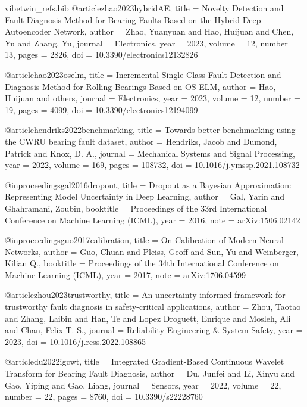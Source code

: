 \begin{filecontents*}{vibetwin_refs.bib}
@article{zhao2023hybridAE,
  title   = {Novelty Detection and Fault Diagnosis Method for Bearing Faults Based on the Hybrid Deep Autoencoder Network},
  author  = {Zhao, Yuanyuan and Hao, Huijuan and Chen, Yu and Zhang, Yu},
  journal = {Electronics},
  year    = {2023},
  volume  = {12},
  number  = {13},
  pages   = {2826},
  doi     = {10.3390/electronics12132826}
}

@article{hao2023oselm,
  title   = {Incremental Single-Class Fault Detection and Diagnosis Method for Rolling Bearings Based on {OS-ELM}},
  author  = {Hao, Huijuan and others},
  journal = {Electronics},
  year    = {2023},
  volume  = {12},
  number  = {19},
  pages   = {4099},
  doi     = {10.3390/electronics12194099}
}

@article{hendriks2022benchmarking,
  title   = {Towards better benchmarking using the {CWRU} bearing fault dataset},
  author  = {Hendriks, Jacob and Dumond, Patrick and Knox, D. A.},
  journal = {Mechanical Systems and Signal Processing},
  year    = {2022},
  volume  = {169},
  pages   = {108732},
  doi     = {10.1016/j.ymssp.2021.108732}
}

@inproceedings{gal2016dropout,
  title     = {Dropout as a {Bayesian} Approximation: Representing Model Uncertainty in Deep Learning},
  author    = {Gal, Yarin and Ghahramani, Zoubin},
  booktitle = {Proceedings of the 33rd International Conference on Machine Learning ({ICML})},
  year      = {2016},
  note      = {arXiv:1506.02142}
}

@inproceedings{guo2017calibration,
  title     = {On Calibration of Modern Neural Networks},
  author    = {Guo, Chuan and Pleiss, Geoff and Sun, Yu and Weinberger, Kilian Q.},
  booktitle = {Proceedings of the 34th International Conference on Machine Learning ({ICML})},
  year      = {2017},
  note      = {arXiv:1706.04599}
}

@article{zhou2023trustworthy,
  title   = {An uncertainty-informed framework for trustworthy fault diagnosis in safety-critical applications},
  author  = {Zhou, Taotao and Zhang, Laibin and Han, Te and Lopez Droguett, Enrique and Mosleh, Ali and Chan, Felix T. S.},
  journal = {Reliability Engineering \& System Safety},
  year    = {2023},
  doi     = {10.1016/j.ress.2022.108865}
}

@article{du2022igcwt,
  title   = {Integrated Gradient-Based Continuous Wavelet Transform for Bearing Fault Diagnosis},
  author  = {Du, Junfei and Li, Xinyu and Gao, Yiping and Gao, Liang},
  journal = {Sensors},
  year    = {2022},
  volume  = {22},
  number  = {22},
  pages   = {8760},
  doi     = {10.3390/s22228760}
}


\end{filecontents*}
